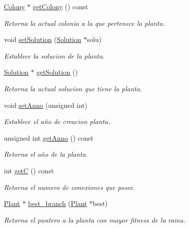 \begin{DoxyCompactItemize}
\hyperlink{class_colony}{Colony} $\ast$ \hyperlink{class_plant_a8c2f0050ea6d88863bd1703d2252606e}{get\+Colony} () const 
\begin{DoxyCompactList}\small\item\em Retorna la actual colonia a la que pertenece la planta. \end{DoxyCompactList}\item 
void \hyperlink{class_plant_ada85019a597aa6d6e3655cc727e8f675}{set\+Solution} (\hyperlink{class_solution}{Solution} $\ast$solu)
\begin{DoxyCompactList}\small\item\em Establece la solucion de la planta. \end{DoxyCompactList}\item 
\hyperlink{class_solution}{Solution} $\ast$ \hyperlink{class_plant_abc664a5111f99ef2dc172b10b8451f84}{get\+Solution} ()
\begin{DoxyCompactList}\small\item\em Retorna la actual solucion que tiene la planta. \end{DoxyCompactList}\item 
void \hyperlink{class_plant_a3a6c02eec89ad04003c7cb6d5769bd6e}{set\+Anno} (unsigned int)
\begin{DoxyCompactList}\small\item\em Establece el año de creacion planta. \end{DoxyCompactList}\item 
unsigned int \hyperlink{class_plant_a7e59304c381b9e930ec70207ce888310}{get\+Anno} () const 
\begin{DoxyCompactList}\small\item\em Retorna el año de la planta. \end{DoxyCompactList}\item 
int \hyperlink{class_plant_a79fc3e80a225263ba150952e49b4533c}{get\+C} () const 
\begin{DoxyCompactList}\small\item\em Retorna el numero de conexiones que posee. \end{DoxyCompactList}\item 
\hyperlink{class_plant}{Plant} $\ast$ \hyperlink{class_plant_ac53b418a18dc6e37e94c3505b04a0a08}{best\+\_\+branch} (\hyperlink{class_plant}{Plant} $\ast$best)
\begin{DoxyCompactList}\small\item\em Retorna el puntero a la planta con mayor fitness de la rama. \end{DoxyCompactList}\item 

\end{DoxyCompactItemize}
